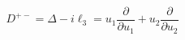 \begin{equation}
D^{+-} = \Delta - i \ell_{3} = u_{1}\frac{\partial}{\partial u_{1}} +u_{2}\frac{\partial}{\partial u_{2}}
\end{equation}

